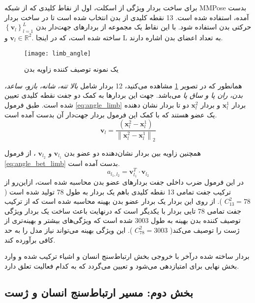 برای ساخت بردار ویژگی از اسکلت، اول از نقاط کلیدی که از شبکه MMPose بدست آمده، استفاده شده است. 13 نقطه کلیدی از بدن انتخاب شده است تا در ساخت بردار حرکتی بدن استفاده شود. با این نقاط یک مجموعه از بردارهای جهت‌دار بدن 
 $\left\{\mathbf{v}_l\right\}_{l=1}^L$
 ساخته شده است،‌ که در اینجا 
 .$\mathbf{v}_l \in \mathbb{R}^2$
 و L به تعداد اعضای بدن اشاره دارند.
 
 \begin{figure}[ht]
 	\centerline{\texttt{[image: limb\_angle]}}
 	\caption{یک نمونه توصیف کننده زاویه بدن}
 	\label{fig:limb_angle}
 \end{figure}

 همانطور که در تصویر %
 \ref{fig:limb_angle}
 مشاهده می‌کنید،‌ 12 بردار شامل 
 \textit{بالا تنه، }
 \textit{شانه، }
\textit{بازو، }
\textit{ساعد، }
\textit{بدن، }
\textit{ران پا و }
\textit{ساق پا}
می‌باشد. جهت این بردارها به کمک دو جفت نقطه کلیدی تعیین شده است.
 طبق فرمول %
 \ref{eq:angle_limb}
 بردار %
 $\mathbf{x}_l^1$
  و بردار %
   $\mathbf{x}_l^2$
 دو تا بردار نشان دهنده یک عضو هستند که با کمک این فرمول بردار جهت‌دار آن بدست آمده است.
\begin{equation}
	\label{eq:angle_limb}
	\mathbf{v}_l=\frac{\left(\mathbf{x}_l^2-\mathbf{x}_l^1\right)}{\left\|\mathbf{x}_l^2-\mathbf{x}_l^1\right\|_2}
\end{equation}

همچنین زاویه بین بردار نشان‌دهنده دو عضو بدن %
   $\mathbf{v}_{l_1}$
   و 
    $\mathbf{v}_{l_2}$
 ، از فرمول %
\ref{eq:angle_bet_limb}
  بدست آمده است.
  \begin{equation}
  	\label{eq:angle_bet_limb}
  	a_{l_1, l_2}=\mathbf{v}_{l_1}^T \cdot \mathbf{v}_{l_2}
  \end{equation}
 در این فرمول ضرب داخلی جفت بردارهای عضو بدن محاسبه شده است، ازاین‌رو از ترکیب جفت تمامی 13 نقطه کلیدی باهم یک بردار به طول 78 تولید شده است (%
  $C_{13}^2=78$
  ). از روی این بردار یک بردار عضو بدن بهینه محاسبه شده است که از ترکیب جفت تمامی 78 تایی بردار با یکدیگر است که درنهایت باعث ساخت یک بردار ویژگی توصیف کننده بدن بهینه به طول 3003 شده است که ویژگی‌های بیشتر و بهینه‌تری از ژست را توصیف می‌کند(
    $C_{78}^2=3003$
  ). این ویژگی بهینه می‌تواند نیاز مدل را به حد کافی برآورده کند. %
  \cite{Recognition_fusing_mutple_cue}
  
  بردار ساخته شده درآخر با خروجی بخش ارتباط‌سنج انسان و اشیاء ترکیب شده و وارد بخش نهایی برای امتیاز‌دهی می‌شود و تعیین می‌گردد که به کدام فعالیت تعلق دارد.
  
   \subsection{بخش دوم: مسیر ارتباط‌سنج انسان و ژست}
   
